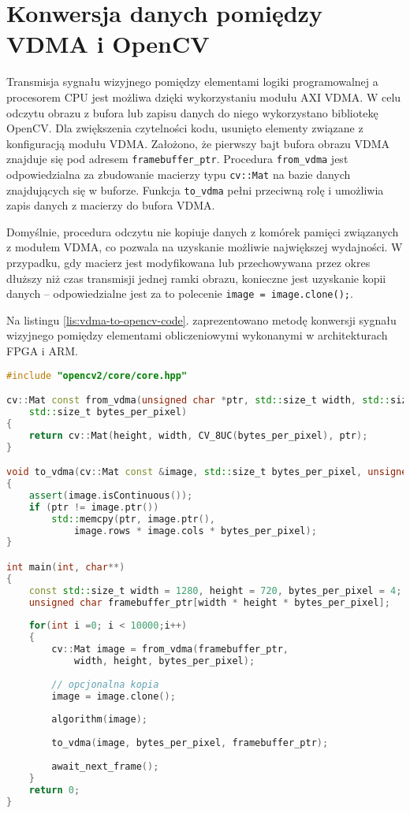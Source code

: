 \section{Konwersja danych pomiędzy VDMA i OpenCV}
\label{sec:vdma-to-opencv}

Transmisja sygnału wizyjnego pomiędzy elementami logiki programowalnej a procesorem CPU jest możliwa dzięki wykorzystaniu modułu AXI VDMA. 
W celu odczytu obrazu z bufora lub zapisu danych do niego wykorzystano bibliotekę OpenCV. 
Dla zwiększenia czytelności kodu, usunięto elementy związane z konfiguracją modułu VDMA. 
Założono, że pierwszy bajt bufora obrazu VDMA znajduje się pod adresem \texttt{framebuffer\_ptr}. 
Procedura \texttt{from\_vdma} jest odpowiedzialna za zbudowanie macierzy typu \texttt{cv::Mat} na bazie danych znajdujących się w buforze. 
Funkcja \texttt{to\_vdma} pełni przeciwną rolę i umożliwia zapis danych z macierzy do bufora VDMA.

Domyślnie, procedura odczytu nie kopiuje danych z komórek pamięci związanych z modułem VDMA, co pozwala na uzyskanie możliwie największej wydajności. 
W przypadku, gdy macierz jest modyfikowana lub przechowywana przez okres dłuższy niż czas transmisji jednej ramki obrazu, konieczne jest uzyskanie kopii danych -- odpowiedzialne jest za to polecenie \texttt{image = image.clone();}.

Na listingu \ref{lis:vdma-to-opencv-code}. zaprezentowano metodę konwersji sygnału wizyjnego pomiędzy elementami obliczeniowymi wykonanymi w architekturach FPGA i ARM.



\begin{lstlisting}[language=C++, label=lis:vdma-to-opencv-code, caption=Konwersja sygnału wizyjnego pomiędzy AXI VDMA i \texttt{cv::Mat}.]
#include "opencv2/core/core.hpp"

cv::Mat const from_vdma(unsigned char *ptr, std::size_t width, std::size_t height,
	std::size_t bytes_per_pixel)
{
	return cv::Mat(height, width, CV_8UC(bytes_per_pixel), ptr);
}

void to_vdma(cv::Mat const &image, std::size_t bytes_per_pixel, unsigned char *ptr)
{
	assert(image.isContinuous());
	if (ptr != image.ptr())
		std::memcpy(ptr, image.ptr(),
			image.rows * image.cols * bytes_per_pixel);
}

int main(int, char**)
{
	const std::size_t width = 1280, height = 720, bytes_per_pixel = 4;
	unsigned char framebuffer_ptr[width * height * bytes_per_pixel];
	
	for(int i =0; i < 10000;i++)
	{
		cv::Mat image = from_vdma(framebuffer_ptr,
			width, height, bytes_per_pixel);
		
		// opcjonalna kopia
		image = image.clone();
		
		algorithm(image);
		
		to_vdma(image, bytes_per_pixel, framebuffer_ptr);
		
		await_next_frame();
	}
	return 0;
}

\end{lstlisting}